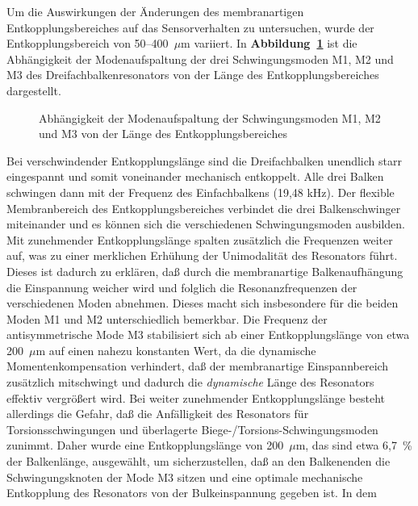 Um die Auswirkungen der Änderungen des membranartigen Entkopplungsbereiches
auf das Sensorverhalten zu untersuchen, wurde der Entkopplungsbereich von
50--400~$\mu$m variiert. In {\bf Abbildung~\ref{abbentkoppl}} ist die
Abhängigkeit der Modenaufspaltung der drei Schwingungsmoden M1, M2 und
M3 des Dreifachbalkenresonators von der Länge des Entkopplungsbereiches
dargestellt.
\begin{figure}[htb]

\begin{center}

\setabbsd
\end{center}
\caption{\label{abbentkoppl}
 Abhängigkeit der Modenaufspaltung der Schwingungsmoden M1, M2 und M3
 von der Länge des Entkopplungsbereiches}
\end{figure}
Bei verschwindender
Entkopplungslänge sind die Dreifachbalken unendlich starr eingespannt
und somit voneinander mechanisch entkoppelt. Alle drei Balken schwingen dann
mit der Frequenz des Einfachbalkens (19,48 kHz). Der flexible Membranbereich
des Entkopplungsbereiches verbindet die drei Balkenschwinger miteinander und
es können sich die verschiedenen Schwingungsmoden ausbilden.
Mit zunehmender Entkopplungslänge spalten zusätzlich die Frequenzen weiter
auf, was zu einer merklichen Erhühung der Unimodalität des Resonators führt.
Dieses ist dadurch zu
erklären, daß durch die membranartige Balkenaufhängung die Einspannung
weicher wird und folglich die Resonanzfrequenzen der verschiedenen Moden
abnehmen. Dieses macht sich insbesondere für die beiden Moden M1 und M2
unterschiedlich bemerkbar. Die Frequenz der antisymmetrische Mode M3
stabilisiert sich ab einer Entkopplungslänge von etwa 200~$\mu$m
auf einen nahezu konstanten Wert, da die dynamische Momentenkompensation
verhindert, daß der membranartige Einspannbereich zusätzlich mitschwingt und
dadurch die {\em dynamische} Länge des Resonators effektiv vergrößert
wird. Bei weiter zunehmender Entkopplungslänge besteht allerdings die
Gefahr, daß die Anfälligkeit des Resonators für Torsionsschwingungen und
überlagerte Biege-/Torsions-Schwingungsmoden zunimmt. Daher wurde eine
Entkopplungslänge von 200~$\mu$m, das sind etwa 6,7~\% der
Balkenlänge, ausgewählt, um sicherzustellen, daß an den Balken\-enden die
Schwingungsknoten der Mode M3 sitzen und eine optimale mechanische
Entkopplung des Resonators von der Bulkeinspannung gegeben ist. In dem

